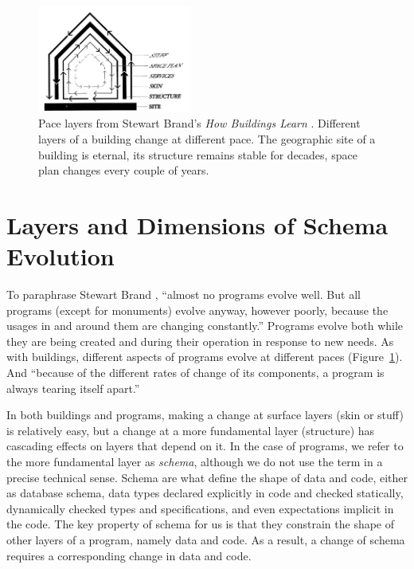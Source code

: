 \documentclass[english,submission]{programming}
\begin{document}
\begin{figure}[t]
\centering
\vspace{-1em}
\includegraphics[width=0.45\textwidth]{figures/layers.png}
\caption{Pace layers from Stewart Brand's \emph{How Buildings Learn} \cite{Brand95}.
  Different layers of a building change at different pace. The geographic
  site of a building is eternal, its structure remains stable for decades, space plan
  changes every couple of years.}
\label{fig:layers}
\end{figure}


\section{Layers and Dimensions of Schema Evolution}

To paraphrase Stewart Brand \cite{Brand95}, ``almost no programs evolve well. But all programs
(except for monuments) evolve anyway, however poorly, because the usages in and around them are
changing constantly.'' Programs evolve both while they are being created and during their operation
in response to new needs. As with buildings, different aspects of programs evolve at different paces
(Figure~\ref{fig:layers}). And ``because of the different rates of change of its components,
a program is always tearing itself apart.''


In both buildings and programs, making a change at surface layers (skin or stuff) is relatively easy,
but a change at a more fundamental layer (structure) has cascading effects on layers that depend on it.
In the case of programs, we refer to the more fundamental layer as \emph{schema}, although we do not
use the term in a precise technical sense. Schema are what define the shape of data and code, either as database schema, data types declared explicitly in code and checked statically, dynamically checked types and specifications, and even expectations implicit in the code.
The key property of schema for us is that they constrain the shape of other layers
of a program, namely data and code. As a result, a change of schema requires a
corresponding change in data and code.
\end{document}
